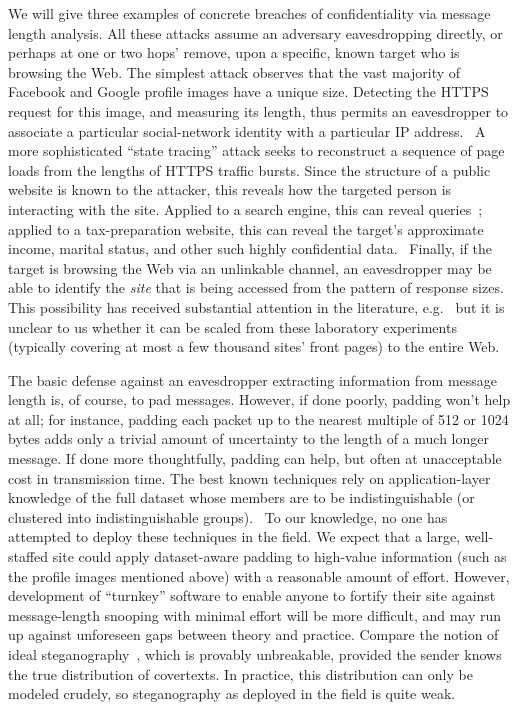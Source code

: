 \documentclass[oneside]{zarticle}
\begin{document}
We will give three examples of concrete breaches of confidentiality
via message length analysis.  All these attacks assume an adversary
eavesdropping directly, or perhaps at one or two hops' remove, upon a
specific, known target who is browsing the Web.  The simplest attack
observes that the vast majority of Facebook and Google profile images
have a unique size.  Detecting the HTTPS request for this image, and
measuring its length, thus permits an eavesdropper to associate a
particular social-network identity with a particular IP
address.~\cite{herrmann2012analyzing, pironti2012identifying} A more
sophisticated “state tracing” attack seeks to reconstruct a sequence
of page loads from the lengths of HTTPS traffic bursts.  Since the
structure of a public website is known to the attacker, this reveals
how the targeted person is interacting with the site.  Applied to a
search engine, this can reveal queries~\cite{castelluccia2010private};
applied to a tax-preparation website, this can reveal the target's
approximate income, marital status, and other such highly confidential
data.~\cite{zhang2010sidebuster} Finally, if the target is browsing
the Web via an unlinkable channel, an eavesdropper may be able to
identify the \emph{site} that is being accessed from the pattern of
response sizes.  This possibility has received substantial attention
in the literature, e.g.~\cite{cai2012touching, cheng1998traffic,
  coull2007web, dyer2012peekaboo} but it is unclear to us whether it
can be scaled from these laboratory experiments (typically covering at
most a few thousand sites' front pages) to the entire Web.

The basic defense against an eavesdropper extracting information from
message length is, of course, to pad messages.  However, if done
poorly, padding won't help at all; for instance, padding each packet
up to the nearest multiple of 512 or 1024 bytes adds only a trivial
amount of uncertainty to the length of a much longer message.  If done
more thoughtfully, padding can help, but often at unacceptable cost in
transmission time.  The best known techniques rely on
application-layer knowledge of the full dataset whose members are to
be indistinguishable (or clustered into indistinguishable
groups).~\cite{chen2010side, mather2012pinpointing,
  backes2013sidechannel} To our knowledge, no one has attempted to
deploy these techniques in the field.  We expect that a large,
well-staffed site could apply dataset-aware padding to high-value
information (such as the profile images mentioned above) with a
reasonable amount of effort.  However, development of “turnkey”
software to enable anyone to fortify their site against message-length
snooping with minimal effort will be more difficult, and may run up
against unforeseen gaps between theory and practice.  Compare the
notion of ideal steganography~\cite{hopper2009provably}, which is
provably unbreakable, provided the sender knows the true distribution
of covertexts.  In practice, this distribution can only be modeled
crudely, so steganography as deployed in the field is quite
weak.~\cite{boehme2010steganalysis}
\end{document}
